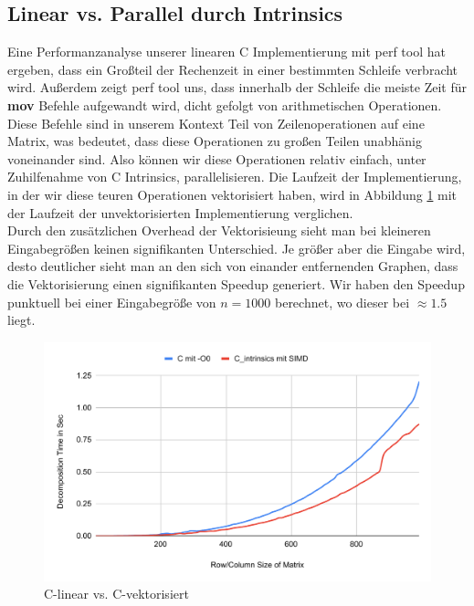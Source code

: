 \documentclass[course=erap]{aspdoc}
\begin{document}
\subsection{Linear vs. Parallel durch Intrinsics}
Eine Performanzanalyse unserer linearen C Implementierung mit perf tool hat ergeben, dass ein Großteil der Rechenzeit in 
einer bestimmten Schleife verbracht wird. Außerdem zeigt perf tool uns, dass innerhalb der Schleife die meiste Zeit 
für \textbf{mov} Befehle aufgewandt wird, dicht gefolgt von arithmetischen Operationen. Diese Befehle sind in unserem 
Kontext Teil von Zeilenoperationen auf eine Matrix, was bedeutet, dass diese Operationen zu großen Teilen unabhänig 
voneinander sind. Also können wir diese Operationen relativ einfach, unter Zuhilfenahme von C Intrinsics, parallelisieren.
Die Laufzeit der Implementierung, in der wir diese teuren Operationen vektorisiert haben, wird in Abbildung \ref{CvsIntrins} 
mit der Laufzeit der unvektorisierten Implementierung verglichen. \\
Durch den zusätzlichen Overhead der Vektorisieung sieht man bei kleineren Eingabegrößen keinen signifikanten Unterschied. 
Je größer aber die Eingabe wird, desto deutlicher sieht man an den sich von einander entfernenden Graphen, dass 
die Vektorisierung einen signifikanten Speedup generiert. Wir haben den Speedup punktuell bei einer Eingabegröße von 
$n = 1000$ berechnet, wo dieser bei $\approx 1.5$  liegt.\\
  \begin{figure}[H]
  \begin{center}
  \caption{C-linear vs. C-vektorisiert}
  \label{CvsIntrins}
  \includegraphics[width = 0.8\linewidth]{CvsIntrins.pdf}
  \end{center}
  \end{figure}
\end{document}
